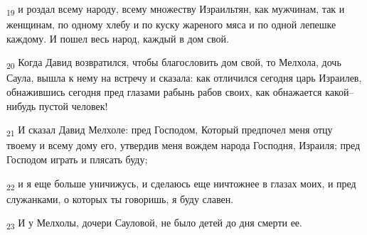 \begin{tcolorbox}
\textsubscript{19} и роздал всему народу, всему множеству Израильтян, как мужчинам, так и женщинам, по одному хлебу и по куску жареного мяса и по одной лепешке каждому. И пошел весь народ, каждый в дом свой.
\end{tcolorbox}
\begin{tcolorbox}
\textsubscript{20} Когда Давид возвратился, чтобы благословить дом свой, то Мелхола, дочь Саула, вышла к нему на встречу и сказала: как отличился сегодня царь Израилев, обнажившись сегодня пред глазами рабынь рабов своих, как обнажается какой--нибудь пустой человек!
\end{tcolorbox}
\begin{tcolorbox}
\textsubscript{21} И сказал Давид Мелхоле: пред Господом, Который предпочел меня отцу твоему и всему дому его, утвердив меня вождем народа Господня, Израиля; пред Господом играть и плясать буду;
\end{tcolorbox}
\begin{tcolorbox}
\textsubscript{22} и я еще больше уничижусь, и сделаюсь еще ничтожнее в глазах моих, и пред служанками, о которых ты говоришь, я буду славен.
\end{tcolorbox}
\begin{tcolorbox}
\textsubscript{23} И у Мелхолы, дочери Сауловой, не было детей до дня смерти ее.
\end{tcolorbox}
